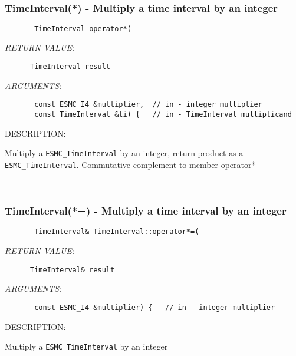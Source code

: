 \mbox{}\hrulefill\ 
 
\subsubsection [TimeInterval(*)] {TimeInterval(*) - Multiply a time interval by an integer}


  
\begin{verbatim}       TimeInterval operator*(\end{verbatim}{\em RETURN VALUE:}
\begin{verbatim}      TimeInterval result\end{verbatim}{\em ARGUMENTS:}
\begin{verbatim}       const ESMC_I4 &multiplier,  // in - integer multiplier
       const TimeInterval &ti) {   // in - TimeInterval multiplicand\end{verbatim}
{\sf DESCRIPTION:\\ }


       Multiply a {\tt ESMC\_TimeInterval} by an integer, return product as a
      {\tt ESMC\_TimeInterval}.  Commutative complement to member operator*
   
 
\mbox{}\hrulefill\ 
 
\subsubsection [TimeInterval(*=)] {TimeInterval(*=) - Multiply a time interval by an integer}


  
\begin{verbatim}       TimeInterval& TimeInterval::operator*=(\end{verbatim}{\em RETURN VALUE:}
\begin{verbatim}      TimeInterval& result\end{verbatim}{\em ARGUMENTS:}
\begin{verbatim}       const ESMC_I4 &multiplier) {   // in - integer multiplier\end{verbatim}
{\sf DESCRIPTION:\\ }


       Multiply a {\tt ESMC\_TimeInterval} by an integer
   
 
